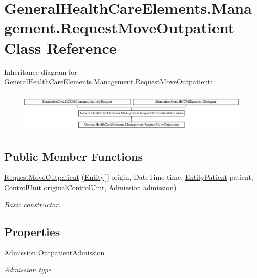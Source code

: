 \hypertarget{class_general_health_care_elements_1_1_management_1_1_request_move_outpatient}{}\section{General\+Health\+Care\+Elements.\+Management.\+Request\+Move\+Outpatient Class Reference}
\label{class_general_health_care_elements_1_1_management_1_1_request_move_outpatient}
Inheritance diagram for General\+Health\+Care\+Elements.\+Management.\+Request\+Move\+Outpatient\+:\begin{figure}[H]
\begin{center}
\leavevmode
\includegraphics[height=1.981132cm]{class_general_health_care_elements_1_1_management_1_1_request_move_outpatient}
\end{center}
\end{figure}
\subsection*{Public Member Functions}
\begin{DoxyCompactItemize}
\item 
\hyperlink{class_general_health_care_elements_1_1_management_1_1_request_move_outpatient_a3dd893b13367a5758c9631937bdf3db0}{Request\+Move\+Outpatient} (\hyperlink{class_simulation_core_1_1_h_c_c_m_elements_1_1_entity}{Entity}\mbox{[}$\,$\mbox{]} origin, Date\+Time time, \hyperlink{class_general_health_care_elements_1_1_entities_1_1_entity_patient}{Entity\+Patient} patient, \hyperlink{class_simulation_core_1_1_h_c_c_m_elements_1_1_control_unit}{Control\+Unit} original\+Control\+Unit, \hyperlink{class_general_health_care_elements_1_1_treatment_admission_types_1_1_admission}{Admission} admission)
\begin{DoxyCompactList}\small\item\em Basic constructor. \end{DoxyCompactList}\end{DoxyCompactItemize}
\subsection*{Properties}
\begin{DoxyCompactItemize}
\item 
\hyperlink{class_general_health_care_elements_1_1_treatment_admission_types_1_1_admission}{Admission} \hyperlink{class_general_health_care_elements_1_1_management_1_1_request_move_outpatient_a1afd5abf5cf9bdae896b891c9d97bbb7}{Outpatient\+Admission}
\begin{DoxyCompactList}\small\item\em Admission type \end{DoxyCompactList}\end{DoxyCompactItemize}


